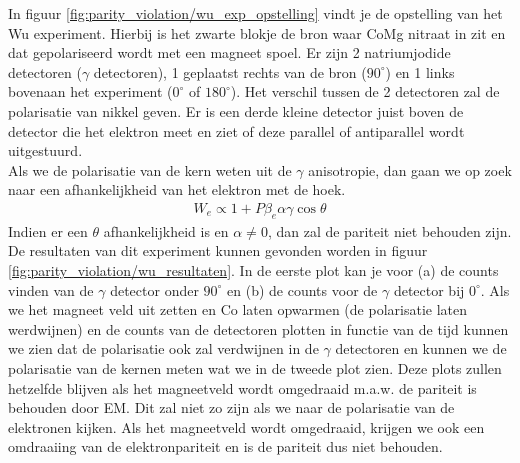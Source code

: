 \documentclass[../main.tex]{subfiles}
\begin{document}
In figuur \ref{fig:parity_violation/wu_exp_opstelling} vindt je de opstelling van het Wu experiment. Hierbij is het zwarte blokje de bron waar CoMg nitraat in zit en dat gepolariseerd wordt met een magneet spoel. Er zijn 2 natriumjodide detectoren ($\gamma$ detectoren), 1 geplaatst rechts van de bron ($90^\circ$) en 1 links bovenaan het experiment ($0^\circ$ of $180^\circ$). Het verschil tussen de 2 detectoren zal de polarisatie van nikkel geven. Er is een derde kleine detector juist boven de detector die het elektron meet en ziet of deze parallel of antiparallel wordt uitgestuurd.\\
Als we de polarisatie van de kern weten uit de $\gamma$ anisotropie, dan gaan we op zoek naar een afhankelijkheid van het elektron met de hoek.
\begin{equation}
    \begin{aligned}
        \label{eq:wu_elektron}
        W_e \propto 1 + P\beta_e\alpha\gamma\cos\theta
    \end{aligned}
\end{equation}
Indien er een $\theta$ afhankelijkheid is en $\alpha \neq 0$, dan zal de pariteit niet behouden zijn. De resultaten van dit experiment kunnen gevonden worden in figuur \ref{fig:parity_violation/wu_resultaten}. In de eerste plot kan je voor (a) de counts vinden van de $\gamma$ detector onder $90^\circ$ en (b) de counts voor de $\gamma$ detector bij $0^\circ$. Als we het magneet veld uit zetten en Co laten opwarmen (de polarisatie laten werdwijnen) en de counts van de detectoren plotten in functie van de tijd kunnen we zien dat de polarisatie ook zal verdwijnen in de $\gamma$ detectoren en kunnen we de polarisatie van de kernen meten wat we in de tweede plot zien. Deze plots zullen hetzelfde blijven als het magneetveld wordt omgedraaid m.a.w. de pariteit is behouden door EM. Dit zal niet zo zijn als we naar de polarisatie van de elektronen kijken. Als het magneetveld wordt omgedraaid, krijgen we ook een omdraaiing van de elektronpariteit en is de pariteit dus niet behouden.
\end{document}

